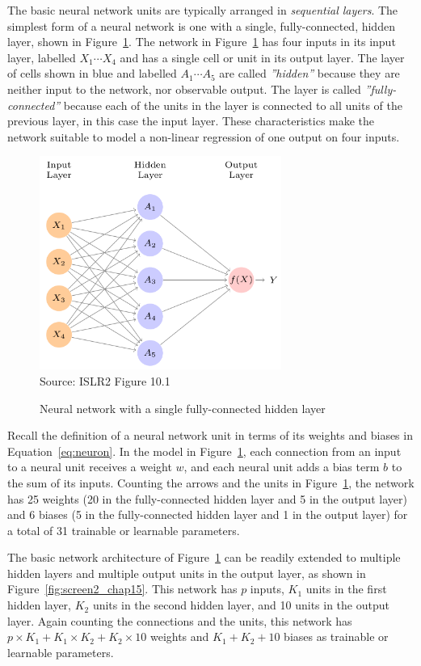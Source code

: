 The basic neural network units are typically arranged in \emph{sequential layers}. The simplest form of a neural network is one with a single, fully-connected, hidden layer, shown in Figure~\ref{fig:screen1_chap15}. The network in Figure~\ref{fig:screen1_chap15} has four inputs in its input layer, labelled $X_1 \cdots X_4$ and has a single cell or unit in its output layer. The layer of cells shown in blue and labelled $A_1 \cdots A_5$ are called \emph{''hidden''} because they are neither input to the network, nor observable output. The layer is called \emph{''fully-connected''} because each of the units in the layer is connected to all units of the previous layer, in this case the input layer. These characteristics make the network suitable to model a non-linear regression of one output on four inputs. 

\begin{figure}
\centering
\includegraphics[height=2.75in]{screen1.png} \\

\scriptsize Source: ISLR2 Figure 10.1
\caption{Neural network with a single fully-connected hidden layer}
\label{fig:screen1_chap15}
\end{figure}

Recall the definition of a neural network unit in terms of its weights and biases in Equation~\ref{eq:neuron}. In the model in Figure~\ref{fig:screen1_chap15}, each connection from an input to a neural unit receives a weight $w$, and each neural unit adds a bias term $b$ to the sum of its inputs. Counting the arrows and the units in Figure~\ref{fig:screen1_chap15}, the network has 25 weights (20 in the fully-connected hidden layer and 5 in the output layer) and 6 biases (5 in the fully-connected hidden layer and 1 in the output layer) for a total of 31 trainable or learnable parameters.

The basic network architecture of Figure~\ref{fig:screen1_chap15} can be readily extended to multiple hidden layers and multiple output units in the output layer, as shown in Figure~\ref{fig:screen2_chap15}. This network has $p$ inputs, $K_1$ units in the first hidden layer, $K_2$ units in the second hidden layer, and 10 units in the output layer. Again counting the connections and the units, this network has $p \times K_1 + K_1 \times K_2 + K_2 \times 10$ weights and $K_1 + K_2 + 10$ biases as trainable or learnable parameters. 


